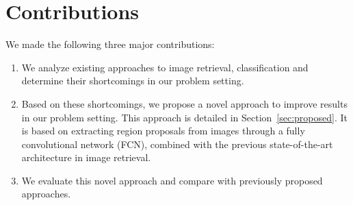 \section{Contributions}
We made the following three major contributions:
\begin{enumerate}
    \item We analyze existing approaches to image retrieval, classification
    and determine their shortcomings in our problem setting.
    \item Based on these shortcomings, we propose a novel approach
    to improve results in our problem setting. This approach is detailed
    in Section~\ref{sec:proposed}. It is based on
    extracting region proposals from images through a fully convolutional
    network (FCN), combined with the previous state-of-the-art architecture
    in image retrieval.
    \item We evaluate this novel approach and compare with previously
    proposed approaches.
\end{enumerate}
